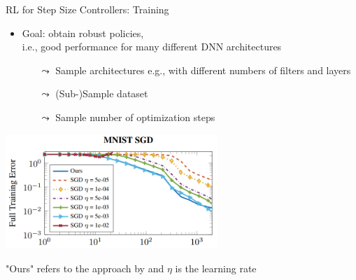 \begin{frame}[c]{RL for Step Size Controllers: Training }

\begin{itemize}
\item Goal: obtain robust policies,\\ i.e., good performance for many different DNN architectures
\begin{itemize}
\item[$\leadsto$] Sample architectures e.g., with different numbers of filters and layers
\item[$\leadsto$] (Sub-)Sample dataset
\item[$\leadsto$] Sample number of optimization steps
\end{itemize}
\end{itemize}

\pause 
\medskip
\centering
\includegraphics[width=0.6\textwidth]{images/l2stepsizecontroler_mnist_training.png}

"Ours" refers to the approach by  and $\eta$ is the learning rate

\end{frame}

